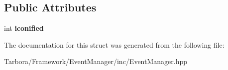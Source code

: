 \subsection*{Public Attributes}
\begin{DoxyCompactItemize}
\item 
\mbox{\label{structTarbora_1_1WindowIconifyEvent_a7468d17df6eba5161e90a32bbb4e3fc8}} 
int {\bfseries iconified}
\end{DoxyCompactItemize}


The documentation for this struct was generated from the following file\+:\begin{DoxyCompactItemize}
\item 
Tarbora/\+Framework/\+Event\+Manager/inc/Event\+Manager.\+hpp\end{DoxyCompactItemize}
